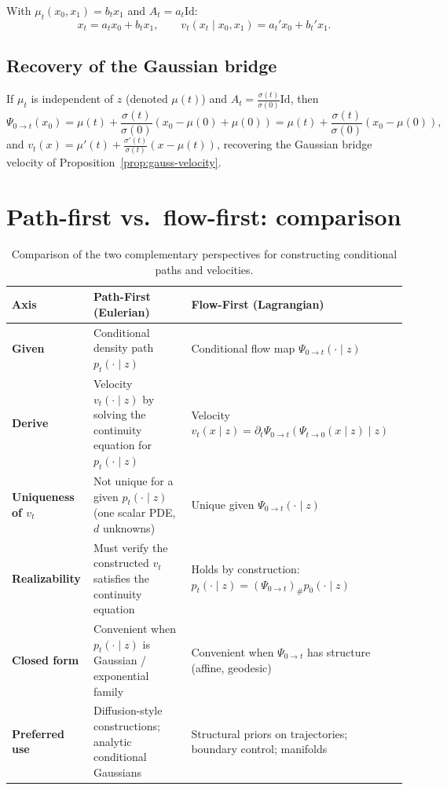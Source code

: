 \documentclass[11pt]{article}
\newcommand{\Id}{\mathrm{Id}}
\theoremstyle{definition}
\theoremstyle{remark}
\begin{document}
With $\mu_t(x_0,x_1) = b_t x_1$ and $A_t = a_t \Id$:
\[
x_t = a_t x_0 + b_t x_1, \qquad v_t(x_t\mid x_0,x_1) = a_t' x_0 + b_t' x_1.
\]

\subsection{Recovery of the Gaussian bridge}

If $\mu_t$ is independent of $z$ (denoted $\mu(t)$) and $A_t = \frac{\sigma(t)}{\sigma(0)}\Id$, then
\[
\Psi_{0\to t}(x_0) = \mu(t) + \frac{\sigma(t)}{\sigma(0)}(x_0 - \mu(0) + \mu(0)) = \mu(t) + \frac{\sigma(t)}{\sigma(0)}(x_0 - \mu(0)),
\]
and $v_t(x) = \mu'(t) + \frac{\sigma'(t)}{\sigma(t)}(x - \mu(t))$, recovering the Gaussian bridge velocity of Proposition~\ref{prop:gauss-velocity}.

\section{Path-first vs.\ flow-first: comparison}\label{sec:comparison}

\begin{table}[h]
\centering
\renewcommand{\arraystretch}{1.4}
\small
\begin{tabular}{@{} >{\bfseries}p{2.5cm} p{5.5cm} p{5.5cm} @{}}
\toprule
Axis & \textbf{Path-First (Eulerian)} & \textbf{Flow-First (Lagrangian)} \\
\midrule
Given & Conditional density path $p_t(\cdot\mid z)$ & Conditional flow map $\Psi_{0\to t}(\cdot\mid z)$ \\
\addlinespace
Derive & Velocity $v_t(\cdot\mid z)$ by solving the continuity equation for $p_t(\cdot\mid z)$ & Velocity $v_t(x\mid z) = \partial_t\Psi_{0\to t}(\Psi_{t\to 0}(x\mid z)\mid z)$ \\
\addlinespace
Uniqueness of $v_t$ & Not unique for a given $p_t(\cdot\mid z)$ (one scalar PDE, $d$ unknowns) & Unique given $\Psi_{0\to t}(\cdot\mid z)$ \\
\addlinespace
Realizability & Must verify the constructed $v_t$ satisfies the continuity equation & Holds by construction: $p_t(\cdot\mid z) = (\Psi_{0\to t})_\# p_0(\cdot\mid z)$ \\
\addlinespace
Closed form & Convenient when $p_t(\cdot\mid z)$ is Gaussian / exponential family & Convenient when $\Psi_{0\to t}$ has structure (affine, geodesic) \\
\addlinespace
Preferred use & Diffusion-style constructions; analytic conditional Gaussians & Structural priors on trajectories; boundary control; manifolds \\
\bottomrule
\end{tabular}
\caption{Comparison of the two complementary perspectives for constructing conditional paths and velocities.}
\label{tab:path-vs-flow}
\end{table}
\end{document}
